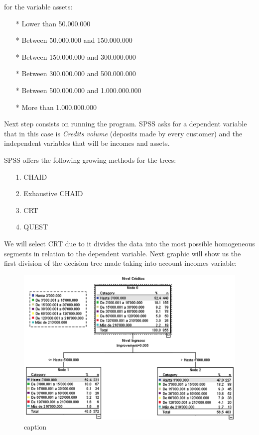 for the variable assets:
\begin{itemize}
\item[*] Lower than 50.000.000
\item[*] Between 50.000.000 and 150.000.000
\item[*] Between 150.000.000 and 300.000.000
\item[*] Between 300.000.000 and 500.000.000
\item[*] Between 500.000.000 and 1.000.000.000
\item[*] More than 1.000.000.000
\end{itemize}
Next step consists on running the program.
SPSS asks for a dependent variable that in this case is \emph{Credits volume} (deposits made by every customer) and the independent variables that will be incomes and assets.

SPSS offers the following growing methods for the trees:
\begin{itemize}
\item[1.] CHAID
\item[2.] Exhaustive CHAID
\item[3.] CRT
\item[4.] QUEST
\end{itemize}
We will select CRT due to it divides the data into the most possible homogeneous segments in relation to the dependent variable.
Next graphic will show us the first division of the decision tree made taking into account incomes variable:
\newpage
\begin{figure}[ht!]
  \centering
  \includegraphics[scale=0.55]{Imagen1}
  \caption{caption}
\end{figure}

